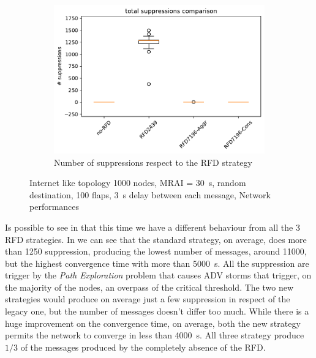 \begin{figure}[h]
\begin{subfigure}[b]{0.49\textwidth}
     \end{subfigure}
     \begin{subfigure}[b]{0.49\textwidth}
         \centering
         \includegraphics[width=\textwidth]{images/RFD/miceVSelephants/elephants/cisco_1000MRAI30_rfd_comparison_suppressions_boxplot.pdf}
         \caption{Number of suppressions respect to the RFD strategy}
         \label{fig:1000_RFD_MRAI_30_suppressions_elephant}
     \end{subfigure}
		\caption{Internet like topology \num{1000} nodes, \ac{MRAI} = \SI{30}{\second},
		random destination, \num{100} flaps, \SI{3}{\second} delay between each
		message, Network performances}
        \label{fig:1000_RFD_MRAI_30_elephant}
\end{figure}

Is possible to see in  that this time we have
a different behaviour from all the \num{3} \ac{RFD} strategies.
In  we can see that
the standard strategy, on average, does more than \num{1250} suppression, producing
the lowest number of messages, around \num{11000}, but the highest convergence
time with more than \SI{5000}{\second}.
All the suppression are trigger by the \textit{Path Exploration} problem that
causes \ac{ADV} storms that trigger, on the majority of the nodes, an overpass
of the critical threshold.
The two new strategies would produce on average just a few suppression in respect
of the legacy one, but the number of messages doesn't differ too much.
While there is a huge improvement on the convergence time, on average,
both the new strategy permits the network to converge in less than \SI{4000}{\second}.
All three strategy produce $1/3$ of the messages produced by the completely
absence of the \ac{RFD}.


